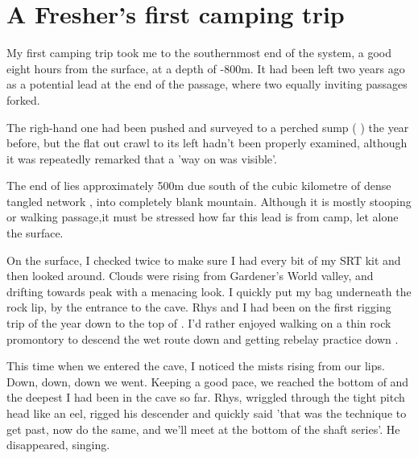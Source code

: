 \section{A Fresher's first camping trip}

\begin{marginfigure}
\end{marginfigure}

My first camping trip took me to the southernmost end of the system, a good eight hours from the surface, at a depth of -800m. It had been left two years ago as a potential lead at the end of the  passage, where two equally inviting passages forked. 


The righ-hand one had been pushed and surveyed to a perched sump (  ) the year before, but the flat out crawl to its left hadn't been properly examined, although it was repeatedly remarked that a 'way on was visible'. 

The end of  lies approximately 500m due south of the cubic kilometre of dense tangled network , into completely blank mountain. Although it is mostly stooping or walking passage,it must be stressed how far this lead is from camp, let alone the surface.

On the surface, I checked twice to make sure I had every bit of my SRT kit and then looked around. Clouds were rising from Gardener's World valley, and drifting towards  peak with a menacing look. I quickly put my bag underneath the rock lip, by the entrance to the cave. Rhys and I had been on the first rigging trip of the year down to the top of . I'd rather enjoyed walking on a thin rock promontory to descend the wet route down  and getting rebelay practice down .

This time when we entered the cave, I noticed the mists rising from our lips. Down, down, down we went. Keeping a good pace, we reached the bottom of  and the deepest I had been in the cave so far. Rhys, wriggled through the tight  pitch head like an eel, rigged his descender and quickly said 'that was the technique to get past, now do the same, and we'll meet at the bottom of the shaft series'. He disappeared, singing.

